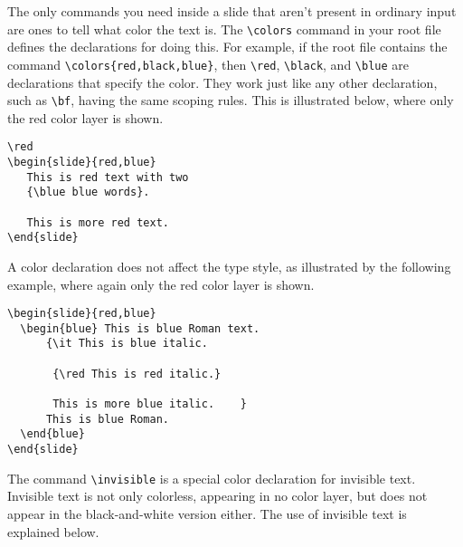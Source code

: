 The only commands you need inside a slide that aren't present in
ordinary \LATEX{} input are ones to tell \SLITEX{} what color the text
is.  The \xsp{}\hbox{\verb"\colors"}\xsp{} command in your root file
defines the declarations  for doing this.
For example, if the root file contains the command
\xsp{}\hbox{\verb"\colors{red,black,blue}"}\Xsp,
then \xsp{}\hbox{\verb"\red"}\Xsp, \xsp{}\hbox{\verb"\black"}\Xsp, and
\xsp{}\hbox{\verb"\blue"}\xsp{} are declarations that specify the
color.	They work just like any other declaration, such as
\xsp{}\hbox{\verb"\bf"}\Xsp, having the same scoping rules.  This is
illustrated below, where only the red color layer is shown.
\begin{exambox}
\midbox
\begin{verbatim}
\red
\begin{slide}{red,blue}
   This is red text with two
   {\blue blue words}.

   This is more red text.
\end{slide}
\end{verbatim}
\end{exambox}
A color declaration does not affect the type style, as illustrated
by the following example, where again only the red color layer is
shown.

\begin{exambox}
\midbox
\begin{verbatim}
\begin{slide}{red,blue}
  \begin{blue} This is blue Roman text.
      {\it This is blue italic.

	   {\red This is red italic.}

	   This is more blue italic.	}
      This is blue Roman.
  \end{blue}
\end{slide}
\end{verbatim}
\end{exambox}

The command \xsp{}\hbox{\verb"\invisible"}\xsp{} is
a special color declaration for invisible text.	 Invisible text is not
only colorless, appearing in no color layer, but does not appear in
the black-and-white version either.  The use of invisible text is
explained below.

